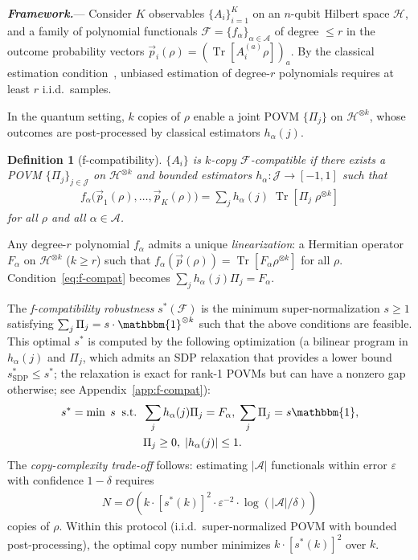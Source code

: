 \documentclass[aps,%
twocolumn,%
floatfix,%
pra,%
amsfonts,%
groupedaddress,%
superscriptaddress]{revtex4-2}%
\newtheorem{definition}{Definition}[section]
\DeclareMathOperator{\tr}{Tr}
\newcommand{\ox}{\otimes}
\newcommand{\1}{\mathbbm{1}}
\newcommand*{\cF}{\mathcal{F}}
\newcommand*{\cH}{\mathcal{H}}
\newcommand*{\cA}{\mathcal{A}}
\newcommand*{\cJ}{\mathcal{J}}
\newcommand\prlsection[1]{\textit{\textbf{#1}}---}
\begin{document}
\prlsection{Framework.}\label{sec:framework}
Consider $K$ observables $\{A_i\}_{i=1}^K$ on an $n$-qubit Hilbert space $\cH$, and a family of polynomial functionals $\cF = \{f_\alpha\}_{\alpha \in \cA}$ of degree $\leq r$ in the outcome probability vectors $\vec{p}_i(\rho) = (\tr[A_i^{(a)}\rho])_a$. By the classical estimation condition~\cite{wu2020polynomial}, unbiased estimation of degree-$r$ polynomials requires at least $r$ i.i.d.\ samples.

In the quantum setting, $k$ copies of $\rho$ enable a joint POVM $\{\Pi_j\}$ on $\cH^{\ox k}$, whose outcomes are post-processed by classical estimators $h_\alpha(j)$.

\begin{definition}[f-compatibility]\label{def:f-compat}
$\{A_i\}$ is \emph{$k$-copy $\cF$-compatible} if there exists a POVM $\{\Pi_j\}_{j\in\cJ}$ on $\cH^{\ox k}$ and bounded estimators $h_\alpha:\cJ\to[-1,1]$ such that
\begin{align}\label{eq:f-compat}
f_\alpha\big(\vec{p}_1(\rho),\ldots,\vec{p}_K(\rho)\big) = \sum_{j} h_\alpha(j)\;\tr[\Pi_j\;\rho^{\ox k}]
\end{align}
for all $\rho$ and all $\alpha \in \cA$.
\end{definition}

Any degree-$r$ polynomial $f_\alpha$ admits a unique \emph{linearization}: a Hermitian operator $F_\alpha$ on $\cH^{\ox k}$ ($k \geq r$) such that $f_\alpha(\vec{p}(\rho)) = \tr[F_\alpha \rho^{\ox k}]$ for all $\rho$. Condition~\eqref{eq:f-compat} becomes $\sum_j h_\alpha(j)\Pi_j = F_\alpha$.

The \emph{f-compatibility robustness} $s^*(\cF)$ is the minimum super-normalization $s \geq 1$ satisfying $\sum_j \Pi_j = s\cdot\1^{\ox k}$ such that the above conditions are feasible. This optimal $s^*$ is computed by the following optimization (a bilinear program in $h_\alpha(j)$ and $\Pi_j$, which admits an SDP relaxation that provides a lower bound $s^*_{\mathrm{SDP}} \leq s^*$; the relaxation is exact for rank-1 POVMs but can have a nonzero gap otherwise; see Appendix~\ref{app:f-compat}):
\begin{align}\label{eq:f-compat-prog}
s^* = \min\; s \;\;\text{s.t.}\;\; &\sum_j h_\alpha(j)\Pi_j = F_\alpha,\; \sum_j \Pi_j = s\1, \notag\\
&\Pi_j \geq 0,\; |h_\alpha(j)| \leq 1.
\end{align}
The \emph{copy-complexity trade-off} follows: estimating $|\cA|$ functionals within error $\varepsilon$ with confidence $1-\delta$ requires
\begin{align}\label{eq:copy-complexity}
N = \mathcal{O}\!\left(k\cdot [s^*(k)]^2\cdot \varepsilon^{-2}\cdot \log(|\cA|/\delta)\right)
\end{align}
copies of $\rho$. Within this protocol (i.i.d.\ super-normalized POVM with bounded post-processing), the optimal copy number minimizes $k\cdot [s^*(k)]^2$ over $k$.
\end{document}
